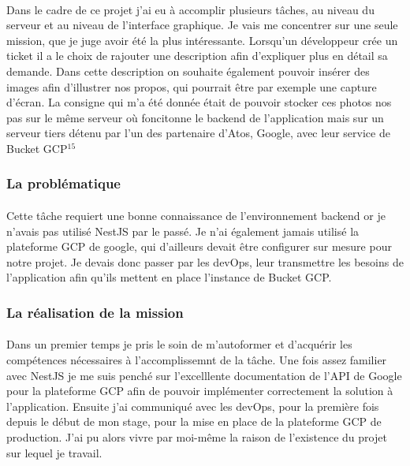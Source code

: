 \documentclass[12pt]{article}
\begin{document}
\begin {sloppypar}
\paragraph{}
Dans le cadre de ce projet j'ai eu à accomplir plusieurs tâches, au niveau du serveur et au niveau de 
l'interface graphique. Je vais me concentrer sur une seule mission, que je juge avoir été la plus 
intéressante. Lorsqu'un développeur crée un ticket il a le choix de rajouter une description afin 
d'expliquer plus en détail sa demande. Dans cette description on souhaite également pouvoir insérer 
des images afin d'illustrer nos propos, qui pourrait être par exemple une capture d'écran. La consigne 
qui m'a été donnée était de pouvoir stocker ces photos nos pas sur le même serveur où foncitonne 
le backend de l'application mais sur un serveur tiers détenu par l'un des partenaire d'Atos, Google, 
avec leur service de Bucket GCP$^{15}$

\subsubsection{La problématique}
\paragraph{}
Cette tâche requiert une bonne connaissance de l'environnement backend or je n'avais pas utilisé 
NestJS par le passé. Je n'ai également jamais utilisé la plateforme GCP de google, qui d'ailleurs 
devait être configurer sur mesure pour notre projet. Je devais donc passer par les devOps,
leur transmettre les besoins de l'application afin qu'ils mettent en place l'instance de Bucket GCP.

\subsubsection{La réalisation de la mission}
\paragraph{}
Dans un premier temps je pris le soin de m'autoformer et d'acquérir les compétences nécessaires 
à l'accomplissemnt de la tâche. Une fois assez familier avec NestJS je me suis penché sur l'excelllente
documentation de l'API de Google pour la plateforme GCP afin de pouvoir implémenter correctement 
la solution à l'application. Ensuite j'ai communiqué avec les devOps, pour la première fois depuis 
le début de mon stage, pour la mise en place de la plateforme GCP de production. J'ai pu alors vivre 
par moi-même la raison de l'existence du projet sur lequel je travail. 


\end{sloppypar}
\end{document}
